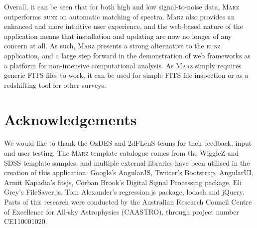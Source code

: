 \documentclass[iop]{emulateapj}
\newcommand{\runz}{\textsc{runz}}
\newcommand{\marz}{\textsc{Marz}}
\begin{document}
Overall, it can be seen that for both high and low signal-to-noise data, \marz{} outperforms \runz{} on automatic matching of spectra. \marz{} also provides an enhanced and more intuitive user experience, and the web-based nature of the application means that installation and updating are now no longer of any concern at all. As such, \marz{} presents a strong alternative to the \runz{} application, and a large step forward in the demonstration of web frameworks as a platform for non-intensive computational analysis. As \marz{} simply requires generic FITS files to work, it can be used for simple FITS file inspection or as a redshifting tool for other surveys.\\

\section*{Acknowledgements}
We would like to thank the OzDES and 2dFLenS teams for their feedback, input and user testing. The \marz{} template catalogue comes from the WiggleZ and SDSS template samples, and multiple external libraries have been utilised in the creation of this application: Google's AngularJS, Twitter's Bootstrap, AngularUI, Armit Kapadia's fitsjs, Corban Brook's Digital Signal Processing package, Eli Grey's FileSaver.js, Tom Alexander's regression.js package, lodash and jQuery. Parts of this research were conducted by the Australian Research Council Centre of Excellence for All-sky Astrophysics (CAASTRO), through project number CE110001020.



\end{document}
